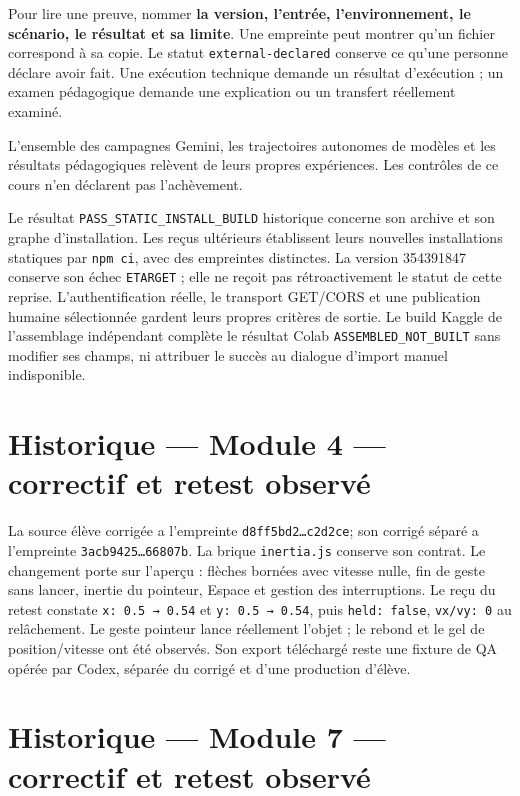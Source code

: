 \documentclass[
  canadien,
  11pt,
  a4paper,
]{report}
\begin{document}
Pour lire une preuve, nommer \textbf{la version, l'entrée,
l'environnement, le scénario, le résultat et sa limite}. Une empreinte
peut montrer qu'un fichier correspond à sa copie. Le statut
\texttt{external-declared} conserve ce qu'une personne déclare avoir
fait. Une exécution technique demande un résultat d'exécution ; un
examen pédagogique demande une explication ou un transfert réellement
examiné.

L'ensemble des campagnes Gemini, les trajectoires autonomes de modèles
et les résultats pédagogiques relèvent de leurs propres expériences. Les
contrôles de ce cours n'en déclarent pas l'achèvement.

Le résultat \texttt{PASS\_\allowbreak{}STATIC\_\allowbreak{}INSTALL\_\allowbreak{}BUILD} historique concerne
son archive et son graphe d'installation. Les reçus ultérieurs
établissent leurs nouvelles installations statiques par
\texttt{npm\ ci}, avec des empreintes distinctes. La version 354391847
conserve son échec \texttt{ETARGET} ; elle ne reçoit pas rétroactivement
le statut de cette reprise. L'authentification réelle, le transport
GET/CORS et une publication humaine sélectionnée gardent leurs propres
critères de sortie. Le build Kaggle de l'assemblage indépendant complète
le résultat Colab \texttt{ASSEMBLED\_\allowbreak{}NOT\_\allowbreak{}BUILT} sans modifier ses
champs, ni attribuer le succès au dialogue d'import manuel indisponible.

\section{Historique --- Module 4 --- correctif et retest
observé}\label{historique-module-4-correctif-et-retest-observuxe9}

La source élève corrigée a l'empreinte \texttt{d8ff5bd2…c2d2ce}; son
corrigé séparé a l'empreinte \texttt{3acb9425…66807b}. La brique
\texttt{inertia.js} conserve son contrat. Le changement porte sur
l'aperçu : flèches bornées avec vitesse nulle, fin de geste sans lancer,
inertie du pointeur, Espace et gestion des interruptions. Le reçu du
retest constate \texttt{x:\ 0.5\ →\ 0.54} et \texttt{y:\ 0.5\ →\ 0.54},
puis \texttt{held:\ false}, \texttt{vx/\allowbreak{}vy:\ 0} au relâchement. Le geste
pointeur lance réellement l'objet ; le rebond et le gel de
position/vitesse ont été observés. Son export téléchargé reste une
fixture de QA opérée par Codex, séparée du corrigé et d'une production
d'élève.

\section{Historique --- Module 7 --- correctif et retest
observé}\label{historique-module-7-correctif-et-retest-observuxe9}
\end{document}

